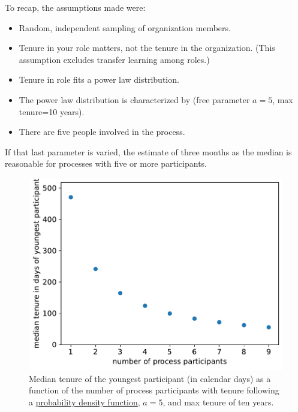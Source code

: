 \begin{samepage}
To recap, the assumptions made were:
\begin{itemize}
    \item Random, independent sampling of organization members. 
    \item Tenure in your role matters, not the tenure in the organization. (This assumption excludes transfer learning among roles.)
    \item Tenure in role fits a power law distribution.
    \item The power law distribution is characterized by (free parameter $a=5$, max tenure=10 years). 
    \item There are five people involved in the process.
\end{itemize}
\end{samepage}
If that last parameter is varied, the estimate of three months as the median  is reasonable for processes with five or more participants.

\begin{figure}[!htb]  %
    \centering %
    \iftoggle{narrowpage}{\newcommand\imgwidth{1}}{\newcommand\imgwidth{0.7}}
    \includegraphics[width=\imgwidth\textwidth]{images/tenure_power_distribution_a5_with_max_tenure10.pdf}
    \caption{Median tenure of the youngest participant (in calendar days) as a function of the number of process participants with tenure following a 
    \href{https://en.wikipedia.org/wiki/Probability_density_function}{probability density function},
    $a=5$, and max tenure of ten years.}
    \label{fig:tenure-powerlaw-5-participants}
\end{figure}


